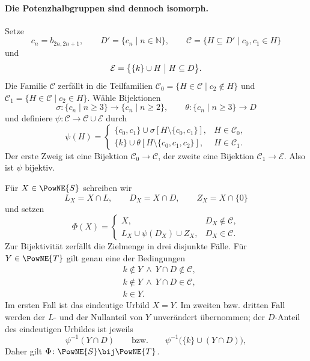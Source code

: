 \documentclass[main.tex]{subfiles}
\begin{document}
\paragraph{Die Potenzhalbgruppen sind dennoch isomorph.}
Setze
\[
  c_n=b_{2n,2n+1},
  \qquad D'=\{c_n\mid n\in\mathbb N\},
  \qquad
  \mathcal C=\{H\subseteq D'\mid c_0,c_1\in H\}
\]
und
\[
  \mathcal E=\bigl\{\{k\}\cup H\bigm|H\subseteq D\bigr\}.
\]
Die Familie \(\mathcal C\) zerfällt in die Teilfamilien
\(\mathcal C_0=\{H\in\mathcal C\mid c_2\notin H\}\) und
\(\mathcal C_1=\{H\in\mathcal C\mid c_2\in H\}\).
Wähle Bijektionen
\[
  \sigma\colon\{c_n\mid n\geq3\}\longrightarrow\{c_n\mid n\geq2\},
  \qquad
  \theta\colon\{c_n\mid n\geq3\}\longrightarrow D
\]
und definiere \(\psi\colon\mathcal C\to\mathcal C\cup\mathcal E\) durch
\[
\psi(H)=
\begin{cases}
  \{c_0,c_1\}\cup\sigma[H\setminus\{c_0,c_1\}],
    &H\in\mathcal C_0,\\[2pt]
  \{k\}\cup\theta[H\setminus\{c_0,c_1,c_2\}],
    &H\in\mathcal C_1.
\end{cases}
\]
Der erste Zweig ist eine Bijektion \(\mathcal C_0\to\mathcal C\), der
zweite eine Bijektion \(\mathcal C_1\to\mathcal E\).  Also ist \(\psi\)
bijektiv.

Für \(X\in\PowNE{S}\) schreiben wir
\[
  L_X=X\cap L,
  \qquad D_X=X\cap D,
  \qquad Z_X=X\cap\{0\}
\]
und setzen
\[
\Phi(X)=
\begin{cases}
  X,&D_X\notin\mathcal C,\\[2pt]
  L_X\cup\psi(D_X)\cup Z_X,&D_X\in\mathcal C.
\end{cases}
\]
Zur Bijektivität zerfällt die Zielmenge in drei disjunkte Fälle.  Für
\(Y\in\PowNE{T}\) gilt genau eine der Bedingungen
\[
\begin{aligned}
  &k\notin Y\ \land\ Y\cap D\notin\mathcal C,\\
  &k\notin Y\ \land\ Y\cap D\in\mathcal C,\\
  &k\in Y.
\end{aligned}
\]
Im ersten Fall ist das eindeutige Urbild \(X=Y\).  Im zweiten bzw. dritten
Fall werden der \(L\)- und der Nullanteil von \(Y\) unverändert übernommen;
der \(D\)-Anteil des eindeutigen Urbildes ist jeweils
\[
  \psi^{-1}(Y\cap D)
  \qquad\text{bzw.}\qquad
  \psi^{-1}\bigl(\{k\}\cup(Y\cap D)\bigr),
\]
Daher gilt \(\Phi\colon\PowNE{S}\bij\PowNE{T}\).
\end{document}
